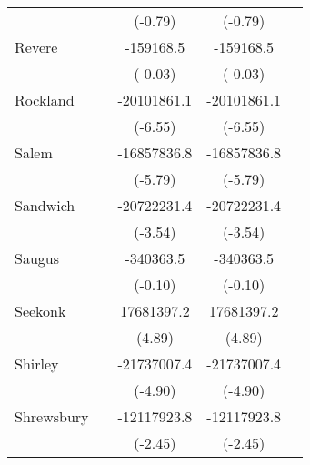 {\begin{tabular}{l*{4}{c}}
                    &                     &     (-0.79)         &     (-0.79)         &                     \\
\addlinespace
Revere              &                     &   -159168.5         &   -159168.5         &                     \\
                    &                     &     (-0.03)         &     (-0.03)         &                     \\
\addlinespace
Rockland            &                     & -20101861.1\sym{***}& -20101861.1\sym{***}&                     \\
                    &                     &     (-6.55)         &     (-6.55)         &                     \\
\addlinespace
Salem               &                     & -16857836.8\sym{***}& -16857836.8\sym{***}&                     \\
                    &                     &     (-5.79)         &     (-5.79)         &                     \\
\addlinespace
Sandwich            &                     & -20722231.4\sym{***}& -20722231.4\sym{***}&                     \\
                    &                     &     (-3.54)         &     (-3.54)         &                     \\
\addlinespace
Saugus              &                     &   -340363.5         &   -340363.5         &                     \\
                    &                     &     (-0.10)         &     (-0.10)         &                     \\
\addlinespace
Seekonk             &                     &  17681397.2\sym{***}&  17681397.2\sym{***}&                     \\
                    &                     &      (4.89)         &      (4.89)         &                     \\
\addlinespace
Shirley             &                     & -21737007.4\sym{***}& -21737007.4\sym{***}&                     \\
                    &                     &     (-4.90)         &     (-4.90)         &                     \\
\addlinespace
Shrewsbury          &                     & -12117923.8\sym{*}  & -12117923.8\sym{*}  &                     \\
                    &                     &     (-2.45)         &     (-2.45)         &                     \\

\end{tabular}}
